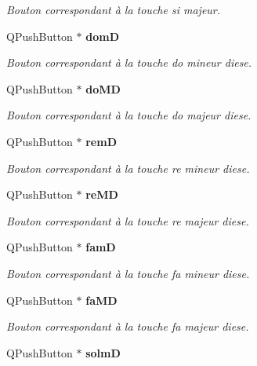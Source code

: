 \begin{DoxyCompactItemize}
\begin{DoxyCompactList}\small\item\em Bouton correspondant à la touche si majeur. \end{DoxyCompactList}\item 
Q\-Push\-Button $\ast$ {\bf dom\-D}\label{class_clavier_piano_a51bbccd311c47a998e97e2d4c8c2b290}

\begin{DoxyCompactList}\small\item\em Bouton correspondant à la touche do mineur diese. \end{DoxyCompactList}\item 
Q\-Push\-Button $\ast$ {\bf do\-M\-D}\label{class_clavier_piano_abdc51cf1f5a2e20d969f0605df6052ed}

\begin{DoxyCompactList}\small\item\em Bouton correspondant à la touche do majeur diese. \end{DoxyCompactList}\item 
Q\-Push\-Button $\ast$ {\bf rem\-D}\label{class_clavier_piano_a0aad113bcf2e9e8be71527031f3c53b2}

\begin{DoxyCompactList}\small\item\em Bouton correspondant à la touche re mineur diese. \end{DoxyCompactList}\item 
Q\-Push\-Button $\ast$ {\bf re\-M\-D}\label{class_clavier_piano_afc58b69735437fb85a83a40edea98c09}

\begin{DoxyCompactList}\small\item\em Bouton correspondant à la touche re majeur diese. \end{DoxyCompactList}\item 
Q\-Push\-Button $\ast$ {\bf fam\-D}\label{class_clavier_piano_a449820c6328ac2e87ac5e5ccc6eca33d}

\begin{DoxyCompactList}\small\item\em Bouton correspondant à la touche fa mineur diese. \end{DoxyCompactList}\item 
Q\-Push\-Button $\ast$ {\bf fa\-M\-D}\label{class_clavier_piano_a3198332ddf73a649be60a82301d05b1a}

\begin{DoxyCompactList}\small\item\em Bouton correspondant à la touche fa majeur diese. \end{DoxyCompactList}\item 
Q\-Push\-Button $\ast$ {\bf solm\-D}\label{class_clavier_piano_a3b031f7f7837a6994126041690887bd2}


\end{DoxyCompactItemize}

